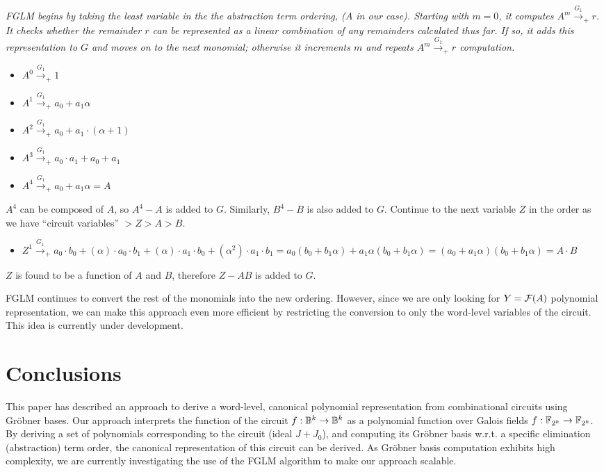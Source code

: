 \begin{Example}
\label{ex:approach}
{\it
FGLM begins by taking the least variable in the the abstraction term 
ordering, ($A$ in our case). Starting with $m=0$, it computes $A^m
\xrightarrow{G_1}_+r$. It checks whether the remainder $r$ can be
represented as a linear combination of any remainders calculated thus
far. If so, it adds this  representation to $G$ and moves on to the
next monomial; otherwise it  increments $m$ and repeats $A^m
\xrightarrow{G_1}_+r$ computation. 

\begin{itemize}
\item $A^0 \xrightarrow{G_1}_+ 1$
\item $A^1 \xrightarrow{G_1}_+ a_0+ a_1 \alpha$
\item $A^2 \xrightarrow{G_1}_+ a_0+a_1 \cdot (\alpha+1) $
\item $A^3 \xrightarrow{G_1}_+ a_0 \cdot a_1+a_0+a_1$
\item $A^4 \xrightarrow{G_1}_+ a_0+ a_1 \alpha = A$
\end{itemize}

$A^4$ can be composed of $A$, so $A^4 - A$ is added to $G$. Similarly,
$B^4 - B$ is also added to $G$. Continue to the next variable $Z$ in
the order as we have ``circuit variables'' $> Z > A > B$. 
\begin{itemize}
\item $Z^1 \xrightarrow{G_1}_+ a_0 \cdot b_0+(\alpha) \cdot a_0 \cdot
  b_1+(\alpha) \cdot a_1 \cdot b_0+(\alpha^2) \cdot a_1 \cdot b_1 = 
a_0(b_0 + b_1 \alpha) + a_1\alpha (b_0 + b_1 \alpha) = (a_0 + a_1
\alpha)(b_0 + b_1 \alpha) = A   \cdot B$ 
\end{itemize}
$Z$ is found to be a function of $A$ and $B$, therefore $Z - AB$ is
added to $G$.
}
\end{Example}

FGLM continues to convert the rest of the monomials into the new ordering. However, 
since we are only looking for $Y={\mathcal{F}}(A)$ polynomial representation, we
can make this approach even more efficient by restricting the
conversion to only the word-level variables of the circuit. This idea
is currently under development. 

\section{Conclusions}
\label{sec:concl}

This paper has described an approach to derive a word-level, canonical
polynomial representation from combinational circuits using Gr\"obner
bases. Our approach interprets the function of the circuit $f: {\mathbb{B}}^k
\rightarrow {\mathbb{B}}^k$ as a polynomial function over Galois fields $f: {\mathbb{F}}_{2^k}
\rightarrow {\mathbb{F}}_{2^k}$. By deriving a set of polynomials corresponding to
the circuit (ideal $J + J_0$), and computing its Gr\"obner basis
w.r.t. a specific elimination (abstraction) term order, the canonical
representation of this circuit can be derived. As Gr\"obner basis
computation exhibits high complexity, we are currently investigating
the use of the FGLM algorithm to make our approach scalable. 
